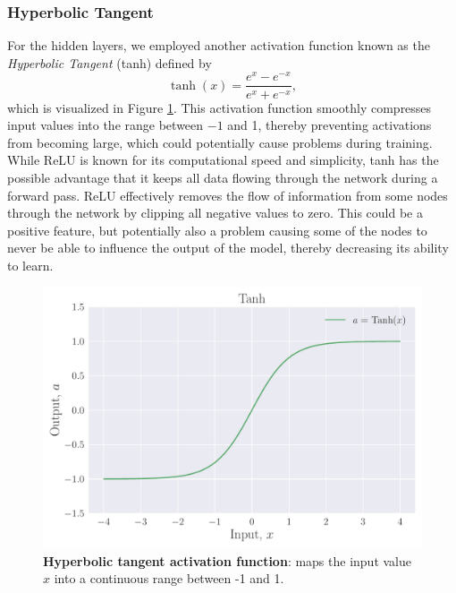 \documentclass[a4paper, UKenglish, 11pt]{uiomaster}
\begin{document}
\subsubsection{Hyperbolic Tangent}
For the hidden layers, we employed another activation function known as the \emph{Hyperbolic Tangent} (tanh) defined by
\begin{equation}
  \tanh(x) = \frac{e^x - e^{-x}}{e^x + e^{-x}},
  \label{eq:I}
\end{equation}
which is visualized in Figure \ref{fig:Tanh}.
This activation function smoothly compresses input values into the range between \(-1\) and 1, thereby preventing activations from becoming large, which could potentially cause problems during training.
While ReLU is known for its computational speed and simplicity, tanh has the possible advantage that it keeps all data flowing through the network during a forward pass. ReLU effectively removes the flow of information from some nodes through the network by clipping all negative values to zero. This could be a positive feature, but potentially also a problem causing some of the nodes to never be able to influence the output of the model, thereby decreasing its ability to learn.
\begin{figure}[ht]
    \centering
    \includegraphics[width=\linewidth]{figures/Tanh.pdf}
    \caption{\textbf{Hyperbolic tangent activation function}: maps the input value $x$ into a continuous range between -1 and 1.}
    \label{fig:Tanh}
\end{figure}

\end{document}

